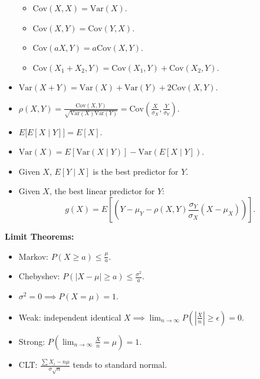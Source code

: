 \documentclass[9pt]{article}
\begin{document}
\begin{multicols*}{2}
\begin{itemize}
            \begin{itemize}
                \item $\mathrm{Cov}(X, X) = \mathrm{Var}(X)$.
                \item $\mathrm{Cov}(X, Y) = \mathrm{Cov}(Y, X)$.
                \item $\mathrm{Cov}(aX, Y) = a\mathrm{Cov}(X, Y)$.
                \item $\mathrm{Cov}(X_1 + X_2, Y) = \mathrm{Cov}(X_1, Y) + \mathrm{Cov}(X_2, Y)$.
            \end{itemize}
            \item $\mathrm{Var}(X + Y) = \mathrm{Var}(X) + \mathrm{Var}(Y) + 2\mathrm{Cov}(X, Y)$.
            \item $\rho(X, Y) = \frac{\mathrm{Cov}(X, Y)}{\sqrt{\mathrm{Var}(X)\mathrm{Var}(Y)}} = \mathrm{Cov}\left(\frac{X}{\sigma_X}, \frac{Y}{\sigma_Y}\right)$.
            \item $E\bigl[E[X \mid Y]\bigr] = E[X]$.
            \item $\mathrm{Var}(X) = E[\mathrm{Var}(X \mid Y)] - \mathrm{Var}(E[X \mid Y])$.
            \item Given $X$, $E[Y \mid X]$ is the best predictor for $Y$.
            \item Given $X$, the best linear predictor for $Y$: 
            \begin{equation*}
                g(X) = E\left[\left(Y - \mu_Y - \rho(X, Y)\frac{\sigma_Y}{\sigma_X}(X - \mu_X)\right)\right].
            \end{equation*}
        \end{itemize}
        \textbf{Limit Theorems:}
        \begin{itemize}
            \item Markov: $P(X \geq a) \leq \frac{\mu}{a}$.
            \item Chebyshev: $P(|X - \mu| \geq a) \leq \frac{\sigma^2}{a}$.
            \item $\sigma^2 = 0 \implies P(X = \mu) = 1$.
            \item Weak: independent identical $X \implies \lim_{n \to \infty}P\left(\left\lvert\frac{\overline{X}}{n}\right\rvert \geq \epsilon\right) = 0$.
            \item Strong: $P\left(\lim_{n \to \infty}\frac{\overline{X}}{n} = \mu\right) = 1$.
            \item CLT: $\frac{\sum X_i - n\mu}{\sigma\sqrt{n}}$ tends to standard normal.
        \end{itemize}

\end{multicols*}
\end{document}
